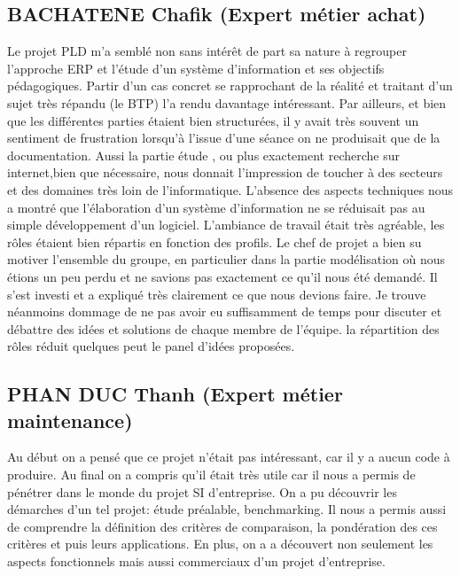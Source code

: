     \subsection{BACHATENE Chafik (Expert métier achat)}

        Le projet PLD m'a semblé non sans intérêt de part sa nature à regrouper l'approche ERP et l'étude d'un système d'information et ses objectifs pédagogiques.
        Partir d'un cas concret se rapprochant de la réalité et traitant d'un sujet très répandu (le BTP) l'a rendu davantage intéressant. Par ailleurs, et bien que les différentes parties étaient bien structurées, il y avait très souvent un sentiment de frustration lorsqu'à l'issue d'une séance on ne produisait que de la documentation. Aussi la partie étude , ou plus exactement recherche sur internet,bien que nécessaire, nous donnait l'impression de toucher à des secteurs et des domaines très loin de l'informatique. 
        L'absence des aspects techniques nous a montré que l'élaboration d'un système d'information ne se réduisait pas au simple développement d'un logiciel. 
        L'ambiance de travail était très agréable, les rôles étaient bien répartis en fonction des profils. Le chef de projet a bien su motiver l'ensemble du groupe, en particulier dans la partie modélisation où nous étions un peu perdu et ne savions pas exactement ce qu'il nous été demandé. Il s'est investi et a expliqué très clairement ce que nous devions faire.
        Je trouve néanmoins dommage de ne pas avoir eu suffisamment de temps pour discuter et débattre des idées et solutions de chaque membre de l'équipe. la répartition des rôles réduit quelques peut le panel d'idées proposées. 

    \subsection{PHAN DUC Thanh (Expert métier maintenance)}

        Au début on a pensé que ce projet n'était pas intéressant, car il y a aucun code à produire. Au final on a compris qu'il était très utile car il nous a permis de pénétrer dans le monde du projet SI d'entreprise. On a pu découvrir les démarches d'un tel projet: étude préalable, benchmarking. Il nous a permis aussi de comprendre la définition des critères de comparaison, la pondération des ces critères et puis leurs applications.  En plus, on a a découvert non seulement les aspects fonctionnels mais aussi commerciaux d'un projet d'entreprise.\\

